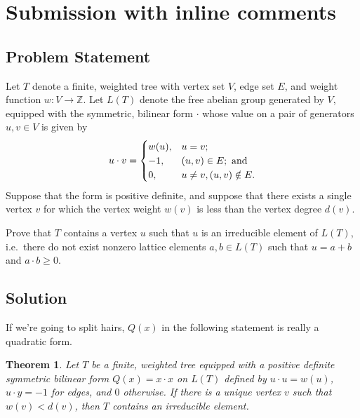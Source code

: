 \documentclass[12pt]{article}
\newcommand{\bZ}{\mathbb{Z}}
\newtheorem{theorem}{Theorem}
\newcommand{\review}[1]{\begin{reviewbox}#1\end{reviewbox}}
\begin{document}
  \section{Submission with inline comments}

%
\date{}


\subsection*{Problem Statement}

Let $T$ denote a finite, weighted tree with vertex set $V$, edge set $E$, and weight function $w : V \longrightarrow \bZ$.
Let $L(T)$ denote the free abelian group generated by $V$, equipped with the symmetric, bilinear form $\cdot$ whose value on a pair of generators $u,v \in V$ is given by 
\[
u \cdot v = 
\begin{cases}
    w(u), & u=v; \\
    -1, & (u,v) \in E; \textup{ and} \\
    0, & u \ne v, (u,v) \notin E.
\end{cases}
\]
Suppose that the form is positive definite, and suppose that there exists a single vertex $v$ for which the vertex weight $w(v)$ is less than the vertex degree $d(v)$.

Prove that $T$ contains a vertex $u$ such that $u$ is an irreducible element of $L(T)$, i.e.~there do not exist nonzero lattice elements $a,b \in L(T)$ such that $u = a+b$ and $a \cdot b \ge 0$.

\subsection*{Solution}
\review{If we're going to split hairs, $Q(x)$ in the following statement is really a quadratic form.}
\begin{theorem}
Let $T$ be a finite, weighted tree equipped with a positive definite symmetric bilinear form $Q(x) = x \cdot x$ on $L(T)$ defined by $u \cdot u = w(u)$, $u \cdot y = -1$ for edges, and $0$ otherwise. If there is a unique vertex $v$ such that $w(v) < d(v)$, then $T$ contains an irreducible element.
\end{theorem}
\end{document}
